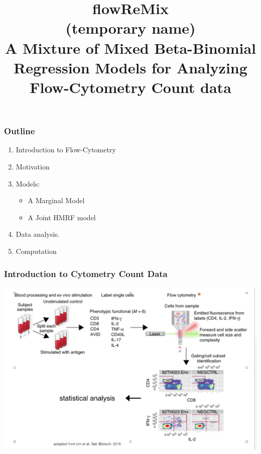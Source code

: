 \documentclass{beamer}
\theoremstyle{definition}
\begin{document}
\title{\textbf{\LARGE{flowReMix}}  \\ (temporary name)  \vspace{ 1 cm }\\ \large{A \textbf{Mixture} of \textbf{Mixed} Beta-Binomial \textbf{Regression} Models for Analyzing \textbf{Flow}-Cytometry Count data}}

\vspace{1 cm}


\begin{frame}[plain]
  \titlepage
\end{frame}



\begin{frame}
\frametitle{Outline}
\begin{enumerate}
\item Introduction to Flow-Cytometry
\vspace{0.3 cm}
\item Motivation
\vspace{0.3 cm}
\item Models:
	\begin{itemize}
	\item A Marginal Model
	\item A Joint HMRF model
	\end{itemize}
	\vspace{0.3 cm}
\item Data analysis. 

\vspace{0.3 cm}
\item  Computation
\end{enumerate}
\end{frame}


\begin{frame}
\frametitle{Introduction to Cytometry Count Data}
\begin{center}
\includegraphics[scale=0.4]{figures/flowcytintro}
\end{center}
\end{frame}
\end{document}
